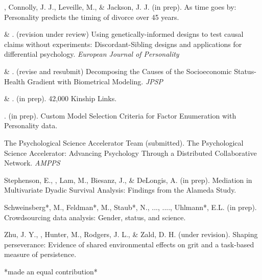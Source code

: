 
\item\meb, Connolly, J. J., Leveille, M., \& Jackson, J. J. (in prep). As time goes by: Personality predicts the timing of divorce over 45 years.%
\item \meb \& \joe. (revision under review) Using genetically-informed designs to test causal claims without experiments: Discordant-Sibling designs and applications for differential psychology. \textit{European Journal of Personality}  \href{https://osf.io/zpdwt/}{\color{blue}{https://osf.io/zpdwt/}}
\item \meb \& \joe.  (revise and resubmit) Decomposing the Causes of the Socioeconomic Status-Health Gradient with Biometrical Modeling.  \textit{JPSP} \href{https://osf.io/vd2kc/}{\color{blue}{https://osf.io/vd2kc/}}
\item \meb \& \joe.  (in prep). 42,000 Kinship Links.
\item \meb. (in prep). Custom Model Selection Criteria for Factor Enumeration with Personality data.
\item The Psychological Science Accelerator Team (submitted). The Psychological Science Accelerator: Advancing Psychology Through a Distributed Collaborative Network. \textit{AMPPS} \href{https://psyarxiv.com/785qu/}{\color{blue}{https://psyarxiv.com/785qu/}}
\item Stephenson, E., \meb, Lam, M., Biesanz, J., \& DeLongis, A. (in prep). Mediation in Multivariate Dyadic Survival Analysis: Findings from the Alameda Study. %
\item Schweinsberg*, M., Feldman*, M., Staub*, N., ..., \meb ...., Uhlmann*, E.L. (in prep). Crowdsourcing data analysis: Gender, status, and science. 
\item Zhu, J. Y., \meb, Hunter, M., Rodgers, J. L., \& Zald, D. H. (under revision). Shaping perseverance: Evidence of shared environmental effects on grit and a task-based measure of persistence. %
\vspace{-2mm}\begin{center}\footnotesize{*made an equal contribution*}\end{center} \vspace{-3mm}
\vspace{-2mm}\begin{center}\end{center} \vspace{-4mm}
